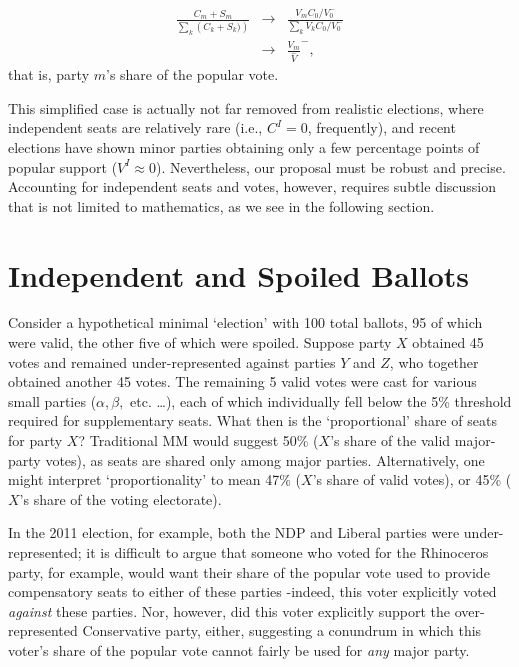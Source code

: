 \documentclass[DIV=calc, paper=a4, fontsize=11pt, twocolumn]{scrartcl}	 %
\begin{document}
\begin{align}
\label{eq:seatshare}
\frac{C_m+S_m}{ \sum\limits_k\left( C_k+S_k) \right)} &\to& \frac{V_m C_0/V_0^-}{ \sum\limits_k V_k C_0/V_0^-} \\
&\to& \frac{V_m}{\hat{V}}^-,
\end{align}
that is, party $m$'s share of the popular vote. 

This simplified case is actually not far removed from realistic elections, where independent seats are relatively rare (i.e., $C^I=0$, frequently), and recent elections have shown minor parties obtaining only a few percentage points of popular support ($V^I \approx 0$). 
Nevertheless, our proposal must be robust and precise. Accounting for independent seats and votes, however, requires subtle discussion that is not limited to mathematics, as we see in the following section. 


\section{Independent and Spoiled Ballots}
\label{sec:outliers}
Consider a hypothetical minimal `election' with 100 total ballots, 95 of which were valid, the other five of which were spoiled. Suppose party $X$ obtained 45 votes and remained under-represented against parties $Y$ and $Z$, who together obtained another 45 votes. The remaining 5 valid votes were cast for various small parties ($\alpha,\beta,$ etc. \ldots), each of which individually fell below the 5\% threshold required for supplementary seats.
What then is the `proportional' share of seats for party $X$?
Traditional MM would suggest 50\% ($X$'s share of the valid major-party votes), as seats are shared only among major parties. Alternatively, one might interpret `proportionality' to mean 47\% ($X$'s share of valid votes), or 45\% ($X$'s share of the voting electorate). 


In the 2011 election, for example, both the NDP and Liberal parties were under-represented; it is difficult to argue that someone who voted for the Rhinoceros party, for example, would want their share of the popular vote used to provide compensatory seats to either of these parties \--indeed, this voter explicitly voted \emph{against} these parties. 
Nor, however, did this voter explicitly support the over-represented Conservative party, either, suggesting a conundrum in which this voter's share of the popular vote cannot fairly be used for \emph{any} major party. 
\end{document}
